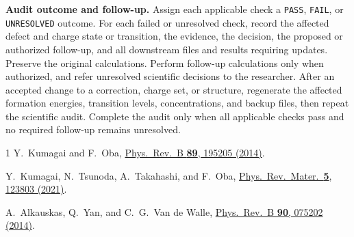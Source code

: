 \documentclass[aps,prmaterials,reprint,superscriptaddress]{revtex4-2}
\begin{document}
\textbf{Audit outcome and follow-up.}
Assign each applicable check a \texttt{PASS}, \texttt{FAIL}, or \texttt{UNRESOLVED} outcome. For each failed or unresolved check, record the affected defect and charge state or transition, the evidence, the decision, the proposed or authorized follow-up, and all downstream files and results requiring updates. Preserve the original calculations. Perform follow-up calculations only when authorized, and refer unresolved scientific decisions to the researcher. After an accepted change to a correction, charge set, or structure, regenerate the affected formation energies, transition levels, concentrations, and backup files, then repeat the scientific audit. Complete the audit only when all applicable checks pass and no required follow-up remains unresolved.

\begin{thebibliography}{1}
Y.~Kumagai and F.~Oba,
\href{https://doi.org/10.1103/PhysRevB.89.195205}{Phys.\ Rev.\ B \textbf{89}, 195205 (2014)}.

Y.~Kumagai, N.~Tsunoda, A.~Takahashi, and F.~Oba,
\href{https://doi.org/10.1103/PhysRevMaterials.5.123803}{Phys.\ Rev.\ Mater.\ \textbf{5}, 123803 (2021)}.

A.~Alkauskas, Q.~Yan, and C.~G.~Van de Walle,
\href{https://doi.org/10.1103/PhysRevB.90.075202}{Phys.\ Rev.\ B \textbf{90}, 075202 (2014)}.
\end{thebibliography}
\end{document}
